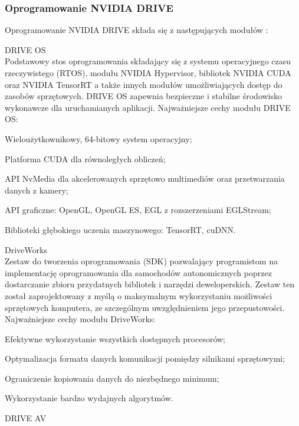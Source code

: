\subsubsection{Oprogramowanie NVIDIA DRIVE}
Oprogramowanie NVIDIA DRIVE składa się z następujących modułów \cite{nvidiaDrive:sdk}:
\begin{enumerate*}
\item DRIVE OS \\
Podstawowy stos oprogramowania składający się z systemu operacyjnego czasu rzeczywistego (RTOS), modułu NVIDIA Hypervisor, bibliotek NVIDIA CUDA oraz NVIDIA TensorRT \cite{nvidia:tensorRt} a także innych modułów umożliwiających dostęp do zasobów sprzętowych. DRIVE OS zapewnia bezpieczne i stabilne środowisko wykonawcze dla uruchamianych aplikacji. Najważniejsze cechy modułu DRIVE OS:
\begin{itemize*}
\item Wieloużytkownikowy, 64-bitowy system operacyjny;
\item Platforma CUDA dla równoległych obliczeń;
\item API NvMedia dla akcelerowanych sprzętowo multimediów oraz przetwarzania danych z kamery;
\item API graficzne: OpenGL, OpenGL ES, EGL z rozszerzeniami EGLStream;
\item Biblioteki głębokiego uczenia maszynowego: TensorRT, cuDNN.
\end{itemize*}
\item DriveWorks \\
Zestaw do tworzenia oprogramowania (SDK) pozwalający programistom na implementację oprogramowania dla samochodów autonomicznych poprzez dostarczanie zbioru przydatnych bibliotek i narzędzi deweloperskich. Zestaw ten został zaprojektowany z myślą o maksymalnym wykorzystaniu możliwości sprzętowych komputera, ze szczególnym uwzględnieniem jego przepustowości. \\
Najważniejsze cechy modułu DriveWorks:
\begin{itemize*}
\item Efektywne wykorzystanie wszystkich dostępnych procesorów;
\item Optymalizacja formatu danych komunikacji pomiędzy silnikami sprzętowymi;
\item Ograniczenie kopiowania danych do niezbędnego minimum;
\item Wykorzystanie bardzo wydajnych algorytmów.
\end{itemize*}
\item DRIVE AV \\

\end{enumerate*}
